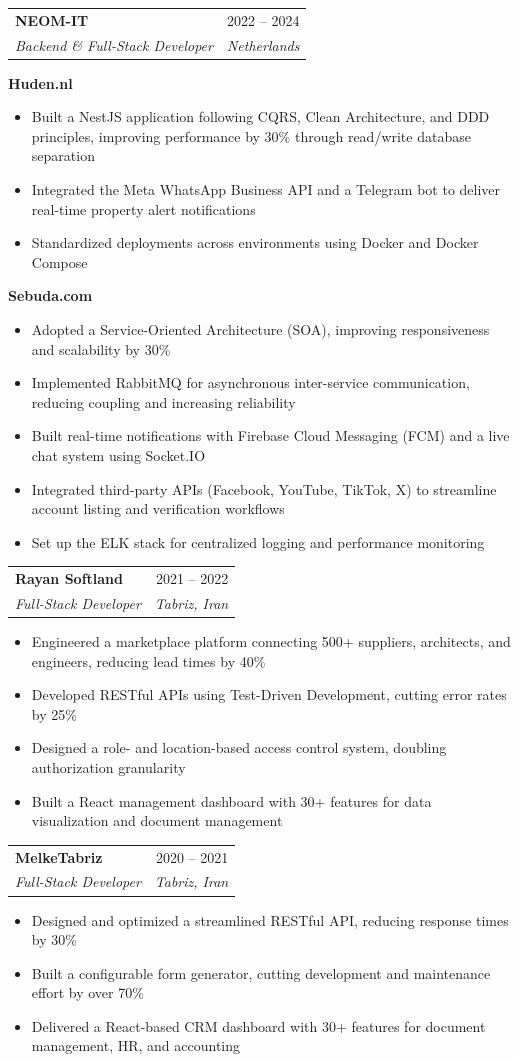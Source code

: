\documentclass[letterpaper,11pt]{article}
\makeatletter
\newcommand{\resumeItem}[1]{
  \item\small{
    {#1 \vspace{-2pt}}
  }
}
\newcommand{\resumeSubheading}[4]{
  \vspace{-2pt}\item
    \begin{tabular*}{0.97\textwidth}[t]{l@{\extracolsep{\fill}}r}
      \textbf{#1} & {\small #2} \\
      \textit{\small#3} & \textit{\small #4} \\
    \end{tabular*}\vspace{-7pt}
}
\newcommand{\resumeItemListStart}{\begin{itemize}}
\newcommand{\resumeItemListEnd}{\end{itemize}\vspace{-5pt}}
\makeatother
\begin{document}
\resumeSubheading
      {NEOM-IT}{2022 -- 2024}
      {Backend \& Full-Stack Developer}{Netherlands}

      \textbf{Huden.nl}
      \begin{itemize}
        \item Built a NestJS application following CQRS, Clean Architecture, and DDD principles, improving performance by 30\% through read/write database separation
        \item Integrated the Meta WhatsApp Business API and a Telegram bot to deliver real-time property alert notifications
        \item Standardized deployments across environments using Docker and Docker Compose
      \end{itemize}

      \textbf{Sebuda.com}
      \begin{itemize}
        \item Adopted a Service-Oriented Architecture (SOA), improving responsiveness and scalability by 30\%
        \item Implemented RabbitMQ for asynchronous inter-service communication, reducing coupling and increasing reliability
        \item Built real-time notifications with Firebase Cloud Messaging (FCM) and a live chat system using Socket.IO
        \item Integrated third-party APIs (Facebook, YouTube, TikTok, X) to streamline account listing and verification workflows
        \item Set up the ELK stack for centralized logging and performance monitoring
      \end{itemize}



    \resumeSubheading
      {Rayan Softland}{2021 -- 2022}
      {Full-Stack Developer}{Tabriz, Iran}
      \resumeItemListStart
        \resumeItem{Engineered a marketplace platform connecting 500+ suppliers, architects, and engineers, reducing lead times by 40\%}
        \resumeItem{Developed RESTful APIs using Test-Driven Development, cutting error rates by 25\%}
        \resumeItem{Designed a role- and location-based access control system, doubling authorization granularity}
        \resumeItem{Built a React management dashboard with 30+ features for data visualization and document management}
      \resumeItemListEnd

    \resumeSubheading
      {MelkeTabriz}{2020 -- 2021}
      {Full-Stack Developer}{Tabriz, Iran}
      \resumeItemListStart
        \resumeItem{Designed and optimized a streamlined RESTful API, reducing response times by 30\%}
        \resumeItem{Built a configurable form generator, cutting development and maintenance effort by over 70\%}
        \resumeItem{Delivered a React-based CRM dashboard with 30+ features for document management, HR, and accounting}
      \resumeItemListEnd
\end{document}
